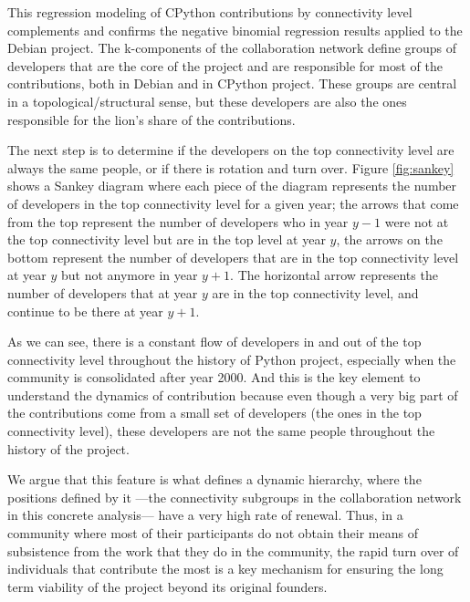 

This regression modeling of CPython contributions by connectivity level complements and confirms the negative binomial regression results applied to the Debian project. The k-components of the collaboration network define groups of developers that are the core of the project and are responsible for most of the contributions, both in Debian and in CPython project. These groups are central in a topological/structural sense, but these developers are also the ones responsible for the lion's share of the contributions.

The next step is to determine if the developers on the top connectivity level are always the same people, or if there is rotation and turn over. Figure \ref{fig:sankey} shows a Sankey diagram where each piece of the diagram represents the number of developers in the top connectivity level for a given year; the arrows that come from the top represent the number of developers who in year $y - 1$ were not at the top connectivity level but are in the top level at year $y$, the arrows on the bottom represent the number of developers that are in the top connectivity level at year $y$ but not anymore in year $y + 1$. The horizontal arrow represents the number of developers that at year $y$ are in the top connectivity level, and continue to be there at year $y + 1$.

As we can see, there is a constant flow of developers in and out of the top connectivity level throughout the history of Python project, especially when the community is consolidated after year 2000. And this is the key element to understand the dynamics of contribution because even though a very big part of the contributions come from a small set of developers (the ones in the top connectivity level), these developers are not the same people throughout the history of the project.

We argue that this feature is what defines a dynamic hierarchy, where the positions defined by it ---the connectivity subgroups in the collaboration network in this concrete analysis--- have a very high rate of renewal. Thus, in a community where most of their participants do not obtain their means of subsistence from the work that they do in the community, the rapid turn over of individuals that contribute the most is a key mechanism for ensuring the long term viability of the project beyond its original founders.

